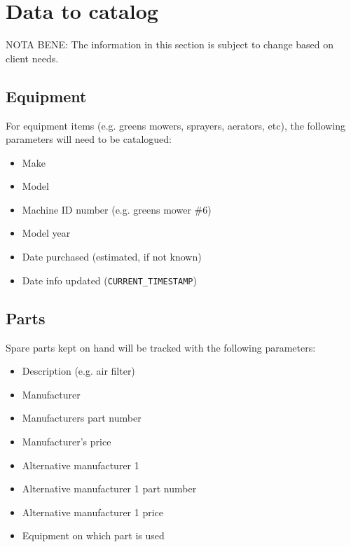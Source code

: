 \documentclass[titlepage]{article}
\begin{document}
    \section{Data to catalog}
        NOTA BENE: The information in this section is subject to change based on client needs.

        \subsection{Equipment}
            For equipment items (e.g. greens mowers, sprayers, aerators, etc), the following
            parameters will need to be catalogued:

            \begin{itemize}
                \item
                Make

                \item
                Model

                \item
                Machine ID number (e.g. greens mower \#6)

                \item
                Model year

                \item
                Date purchased (estimated, if not known)

                \item
                Date info updated (\verb|CURRENT_TIMESTAMP|)

            \end{itemize}

        \subsection{Parts}
            Spare parts kept on hand will be tracked with the following parameters:

            \begin{itemize}
                \item
                Description (e.g. air filter)

                \item
                Manufacturer

                \item
                Manufacturers part number

                \item
                Manufacturer's price

                \item
                Alternative manufacturer 1

                \item
                Alternative manufacturer 1 part number

                \item
                Alternative manufacturer 1 price

                \item
                Equipment on which part is used
            \end{itemize}
\end{document}

